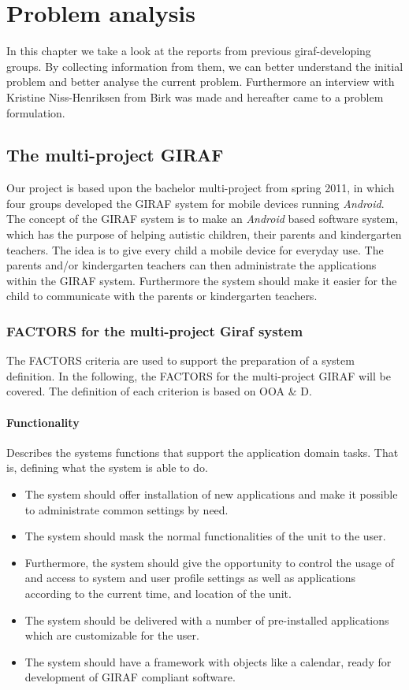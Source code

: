 \chapter{Problem analysis}

In this chapter we take a look at the reports from previous giraf-developing groups. By collecting information from them, we can better understand the initial problem and better analyse the current problem. Furthermore an interview with Kristine Niss-Henriksen from Birk was made and hereafter came to a problem formulation. 

\section{The multi-project GIRAF}
Our project is based upon the bachelor multi-project from spring 2011, in which four groups developed the GIRAF system for mobile devices running \textit{Android}. The concept of the GIRAF system is to make an \textit{Android} based software system, which has the purpose of helping autistic children, their parents and kindergarten teachers. The idea is to give every child a mobile device for everyday use. The parents and/or kindergarten teachers can then administrate the applications within the GIRAF system. Furthermore the system should make it easier for the child to communicate with the parents or kindergarten teachers. 

\subsection{FACTORS for the multi-project Giraf system}
The FACTORS criteria are used to support the preparation of a system definition. In the following, the FACTORS for the multi-project GIRAF will be covered\cite{giraffactors}. The definition of each criterion is based on OOA \& D\cite{OOAD}.

\subsubsection{Functionality} 
Describes the systems functions that support the application domain tasks. That is, defining
what the system is able to do.
\begin{itemize}
	\item The system should offer installation of new applications and make it possible to administrate common settings by need. 
	\item The system should mask the normal functionalities of the unit to the user.
	\item Furthermore, the system should give the opportunity to control the usage of and access to system and user profile settings as well as applications according to the current time, and location of the unit.
	\item The system should be delivered with a number of pre-installed applications which are customizable for the user.
	\item The system should have a framework with objects like a calendar, ready for development of GIRAF compliant software.
\end{itemize}

